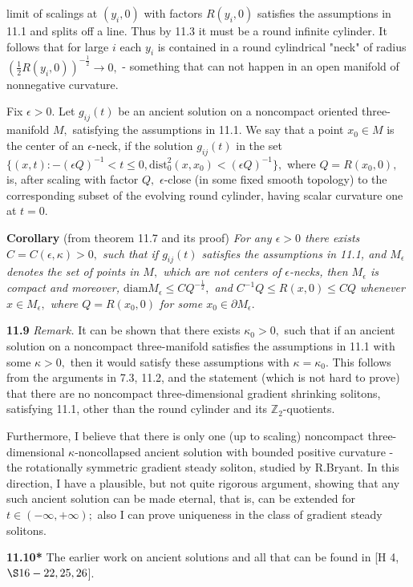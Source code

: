 \documentclass[12pt]{article}
\newcommand{\e}{\epsilon}
\theoremstyle{plain}
{\swapnumbers
\newtheorem{thm}{Theorem}[section]
\newtheorem{cor}[thm]{Corollary}
\newtheorem{lem}[thm]{Lemma}
\newtheorem{prop}[thm]{Proposition}
}
\theoremstyle{definition}
{\swapnumbers
\newtheorem{defn}[thm]{Definition}
\newtheorem{nota}[thm]{Notation}
\newtheorem{parag}[thm]{}
\newtheorem*{parstr}{\addtocounter{thm}{1}\thesection.\arabic{thm}*}
\newtheorem*{intropar}{\addtocounter{thm}{1}\arabic{thm}}
}
\theoremstyle{remark} {\swapnumbers
\newtheorem{rem}[thm]{Remark}
\newtheorem{exam}[thm]{Example}
\newtheorem{lemma}[thm]{Lemma}
\newtheorem{claim}[thm]{Claim}
}
\numberwithin{equation}{section}
\begin{document}
\begin{parag}
  limit of scalings at $(y_i,0)$ with factors $R(y_i,0)$ satisfies
  the assumptions in 11.1 and splits off a line. Thus by 11.3 it
  must be a round infinite cylinder. It follows that for large $i$
   each $y_i$ is contained in a round cylindrical "neck" of radius
   $(\frac{1}{2}R(y_i,0))^{-\frac{1}{2}}\to 0,$ - something that can not happen
   in an open manifold of nonnegative curvature.\end{parag} \begin{parag} Fix
   $\e>0.$ Let $g_{ij}(t)$ be an ancient solution on a noncompact
   oriented three-manifold $M,$ satisfying the assumptions in
   11.1. We say that a point $x_0\in M$ is the center of an
   $\e$-neck, if the solution $g_{ij}(t)$ in the set $\{(x,t):
   -(\e Q)^{-1}<t\le 0, \mbox{dist}_0^2(x,x_0)<(\e Q)^{-1}\},$
   where $Q=R(x_0,0),$ is, after scaling with factor $Q,$
   $\e$-close (in some fixed smooth topology) to the corresponding
   subset of the evolving round cylinder, having scalar curvature
   one at $t=0.$ \par {\bf Corollary}  (from theorem 11.7 and its
   proof)
    {\it For any $\e>0$ there exists $C=C(\e,\kappa)>0,$ such that if
    $g_{ij}(t)$ satisfies the assumptions in 11.1, and $M_\e$
    denotes the set of points in $M,$ which are not centers of
    $\e$-necks, then $M_{\e}$ is compact and moreover,
    $\mbox{diam}M_{\e} \le CQ^{-\frac{1}{2}},$ and
    $C^{-1}Q\le R(x,0)\le CQ$ whenever $x\in M_{\e},$ where
    $Q=R(x_0,0)$ for some $x_0\in \partial M_{\e}.$ }\end{parag} {\bf 11.9} {\it Remark.}
     It can be shown that there exists
    $\kappa_0>0,$ such that if an ancient solution on a noncompact
    three-manifold satisfies the assumptions in 11.1 with some
    $\kappa>0,$ then it would satisfy these assumptions with
    $\kappa=\kappa_0.$ This follows from the arguments in 7.3,
    11.2, and the statement (which is not hard to prove) that
    there are no noncompact three-dimensional gradient shrinking
    solitons, satisfying 11.1, other than the round cylinder and
    its $\mathbb{Z}_2$-quotients. \par Furthermore, I believe
    that there is only one (up to scaling) noncompact
    three-dimensional $\kappa$-noncollapsed ancient solution with
    bounded positive curvature - the rotationally symmetric
    gradient steady soliton, studied by R.Bryant. In this
    direction, I have a plausible, but not quite rigorous
    argument, showing that any such ancient solution can be made
    eternal, that is, can be extended for $t\in (-\infty
    ,+\infty);$ also I can prove uniqueness in the class of
    gradient steady solitons. \par {\bf 11.10*} The earlier work on
    ancient solutions  and all that can be found in [H 4, $\S 16-22,25,26$].
\end{document}
